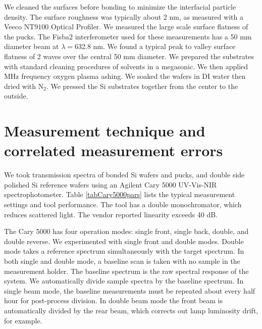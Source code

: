 \documentclass[osajnl,preprint,showpacs,superscriptaddress,12pt]{revtex4-1} %
\begin{document}
We cleaned the surfaces before bonding to minimize the interfacial particle density.  The surface roughness was typically about 2 nm, as measured with a Veeco NT9100 Optical Profiler.  We measured the large scale surface flatness of the pucks.  The Fisba2 interferometer used for these measurements has a 50 mm diameter beam at $\lambda=$632.8 nm.  We found a typical peak to valley surface flatness of 2 waves over the central 50 mm diameter.  We prepared the substrates with standard cleaning procedures of solvents in a megasonic.  We then applied MHz frequency oxygen plasma ashing.  We soaked the wafers in DI water then dried with N$_2$.  We pressed the Si substrates together from the center to the outside.


\section{Measurement technique and correlated measurement errors}
We took transmission spectra of bonded Si wafers and pucks, and double side polished Si reference wafers using an Agilent Cary 5000 UV-Vis-NIR spectrophotometer.  Table \ref{tabCary5000pars} lists the typical measurement settings and tool performance.  The tool has a double monochromator, which reduces scattered light.  The vendor reported linearity exceeds 40 dB.

The Cary 5000 has four operation modes: single front, single back, double, and double reverse.  We experimented with single front and double modes.  Double mode takes a reference spectrum simultaneously with the target spectrum.  In both single and double mode, a baseline scan is taken with no sample in the measurement holder.  The baseline spectrum is the raw spectral response of the system.  We automatically divide sample spectra by the baseline spectrum.  In single beam mode, the baseline measurements must be repeated about every half hour for post-process division.  In double beam mode the front beam is automatically divided by the rear beam, which corrects out lamp luminosity drift, for example.  
\end{document}
